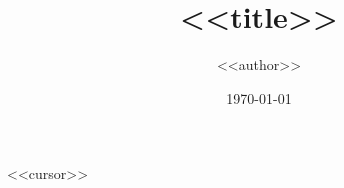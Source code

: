 \documentclass{article}
\title{<<title>>}
\author{<<author>>}
\date{\today}
\begin{document}
\maketitle

<<cursor>>
\end{document}
